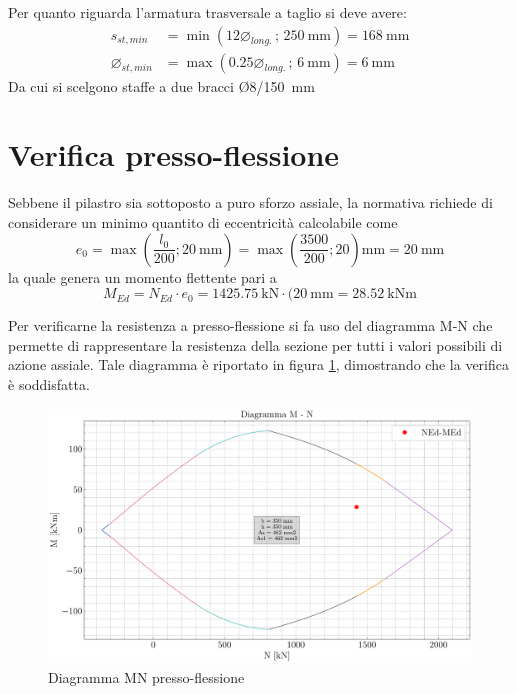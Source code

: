 Per quanto riguarda l'armatura trasversale a taglio si deve avere:
\begin{align}
    s_{st,min} &= \min\left( 12\varnothing_{long.} \, ; \, \SI{250}{\milli\metre} \right)= \SI{168}{\milli\metre}\\
    \varnothing_{st, min} &= \max\left( 0.25\varnothing_{long.} \, ; \, \SI{6}{\milli\metre} \right)= \SI{6}{\milli\metre}
\end{align}
Da cui si scelgono staffe a due bracci Ø8/\SI{150}{\milli\metre}

\section{Verifica presso-flessione}
Sebbene il pilastro sia sottoposto a puro sforzo assiale, la normativa richiede di considerare un minimo quantito di eccentricità calcolabile come
\[
    e_0 = \max \left(\frac{l_0}{200};  \SI{20}{\milli\metre} \right)  = \max \left(\frac{3500}{200};  20 \right)\si{\milli\metre} = \SI{20}{\milli\metre}
\]
la quale genera un momento flettente pari a 
\begin{equation}
    M_{Ed} = N_{Ed}\cdot e_0  = \SI{1425.75}{\kilo\newton} \cdot (\SI{20}{\milli\metre} = \SI{28.52}{\kilo\newton\metre}
\end{equation}

Per verificarne la resistenza a presso-flessione si fa uso del diagramma M-N che permette di rappresentare la resistenza della sezione  per tutti i valori possibili di azione assiale.
Tale diagramma è riportato in figura \ref{fig:MN_diagram_primo_ordine}, dimostrando che la verifica è soddisfatta.
\begin{figure}[H]
    \centering
    \includegraphics[width=\textwidth]{IMG/M_N_diagram_pilastro_primo_ordine.pdf}
    \caption{Diagramma MN presso-flessione}
    \label{fig:MN_diagram_primo_ordine}
\end{figure}


